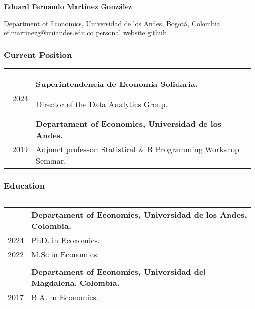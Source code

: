 \documentclass[12pt]{article}
\begin{document}
\begin{center}
\par{\huge \textbf{Eduard Fernando Martínez González}\par}
 Department of Economics, Universidad de los Andes, Bogotá, Colombia. \\
\faEnvelope \hspace{0.05cm} \href{mailto:ef.martinezg@uniandes.edu.co}{ef.martinezg@uniandes.edu.co} \faGlobe \hspace{0.05cm} \href{https://eduard-martinez.github.io/}{personal website} \faGithub \hspace{0.05cm} \href{https://github.com/eduard-martinez}{github}
\end{center}

\subsubsection*{Current Position}
\vspace{-20pt}
\rule{\textwidth}{1pt} \hfill
\begin{tabular}{r|p{15cm}}
     & \textbf{Superintendencia de Economía Solidaria.} \\
2023 - & Director of the Data Analytics Group. \\
     & \textbf{Departament of Economics, Universidad de los Andes.} \\
2019 - & Adjunct professor: Statistical \& R Programming  Workshop Seminar.
\end{tabular} 

\subsubsection*{Education}
\vspace{-20pt}
\rule{\textwidth}{1pt} \hfill
\begin{tabular}{r|p{15cm}}
         & \textbf{Departament of Economics, Universidad de los Andes, Colombia.} \\
2024 & PhD. in Economics. \\

2022 & M.Sc in Economics. \\
\multicolumn{2}{c}{} \\
         & \textbf{Departament of Economics, Universidad del Magdalena, Colombia.} \\
2017 & B.A. In Economics.
\end{tabular} 
\end{document}
